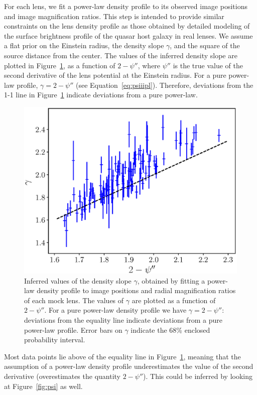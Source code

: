 \documentclass[usenatbib]{mnras}
\def\psiii{\psi''}
\def\Fref#1{Figure~\ref{#1}\xspace}
\def\Eref#1{Equation~\ref{#1}\xspace}
\begin{document}
For each lens, we fit a power-law density profile to its observed image positions and image magnification ratios. This step is intended to provide similar constraints on the lens density profile as those obtained by detailed modeling of the surface brightness profile of the quasar host galaxy in real lenses.
We assume a flat prior on the Einstein radius, the density slope $\gamma$, and the square of the source distance from the center.
The values of the inferred density slope are plotted in \Fref{fig:slope}, as a function of $2-\psiii$, where $\psiii$ is the true value of the second derivative of the lens potential at the Einstein radius. For a pure power-law profile, $\gamma = 2-\psiii$ (see \Eref{eq:psiiipl}). Therefore, deviations from the 1-1 line in \Fref{fig:slope} indicate deviations from a pure power-law.
%
\begin{figure}
 \includegraphics[width=\columnwidth]{gamma_fit.eps}
 \caption{
Inferred values of the density slope $\gamma$, obtained by fitting a power-law density profile to image positions and radial magnification ratios of each mock lens. The values of $\gamma$ are plotted as a function of $2-\psiii$. For a pure power-law density profile we have $\gamma = 2-\psiii$: deviations from the equality line indicate deviations from a pure power-law profile.
Error bars on $\gamma$ indicate the 68\% enclosed probability interval.
}
 \label{fig:slope}
\end{figure}
%
Most data points lie above of the equality line in \Fref{fig:slope}, meaning that the assumption of a power-law density profile underestimates the value of the second derivative (overestimates the quantity $2-\psiii$). This could be inferred by looking at \Fref{fig:psi} as well.
\end{document}
